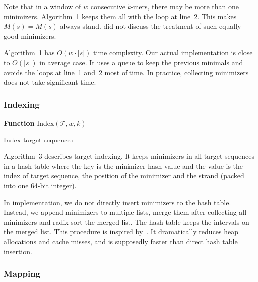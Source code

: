 \documentclass{bioinfo}
\begin{document}
\begin{methods}
Note that in a window of $w$ consecutive $k$-mers, there may be more than one
minimizers. Algorithm~1 keeps them all with the loop at line~2. This makes
$M(s)=M(\overline{s})$ always stand. \citet{Roberts:2004fv} did not discuss
the treatment of such equally good minimizers.

Algorithm~1 has $O(w\cdot|s|)$ time complexity. Our actual implementation is
close to $O(|s|)$ in average case. It uses a queue to keep the previous
minimals and avoids the loops at line~1 and~2 most of time. In practice,
collecting minimizers does not take significant time.

\subsubsection{Indexing}

\begin{algorithm}[ht]
\DontPrintSemicolon
\footnotesize
{}
\BlankLine
\textbf{Function} {\sc Index}$(\mathcal{T},w,k)$
\caption{Index target sequences}
\end{algorithm}

Algorithm~3 describes target indexing. It keeps minimizers in all target
sequences in a hash table where the key is the minimizer hash value and the
value is the index of target sequence, the position of the minimizer and the
strand (packed into one 64-bit integer).

In implementation, we do not directly insert minimizers to the hash table.
Instead, we append minimizers to multiple lists, merge them after collecting
all minimizers and radix sort the merged list. The hash table keeps the
intervals on the merged list. This procedure is inspired
by~\citet{DBLP:conf/wabi/Myers14}. It dramatically reduces heap allocations and
cache misses, and is supposedly faster than direct hash table insertion.

\subsubsection{Mapping}


\end{methods}
\end{document}
